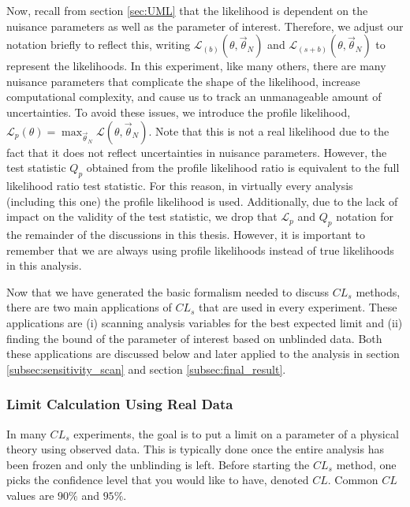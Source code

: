 Now, recall from section \ref{sec:UML} that the likelihood is dependent on the nuisance parameters as well as the parameter of interest. Therefore, we adjust our notation briefly to reflect this, writing $\mathcal{L}_{(b)}(\theta, \vec{\theta}_N)$ and $\mathcal{L}_{(s+b)}(\theta, \vec{\theta}_N)$ to represent the likelihoods. In this experiment, like many others, there are many nuisance parameters that complicate the shape of the likelihood, increase computational complexity, and cause us to track an unmanageable amount of uncertainties. To avoid these issues, we introduce the profile likelihood, $\mathcal{L}_p(\theta) = \max_{\vec{\theta}_N} \mathcal{L}(\theta, \vec{\theta}_N)$. Note that this is not a real likelihood due to the fact that it does not reflect uncertainties in nuisance parameters. However, the test statistic $Q_p$ obtained from the profile likelihood ratio is equivalent to the full likelihood ratio test statistic. For this reason, in virtually every analysis (including this one) the profile likelihood is used. Additionally, due to the lack of impact on the validity of the test statistic, we drop that $\mathcal{L}_p$ and $Q_p$ notation for the remainder of the discussions in this thesis. However, it is important to remember that we are always using profile likelihoods instead of true likelihoods in this analysis. 

Now that we have generated the basic formalism needed to discuss $CL_s$ methods, there are two main applications of $CL_s$ that are used in every experiment. These applications are (i) scanning analysis variables for the best expected limit and (ii) finding the bound of the parameter of interest based on unblinded data. Both these applications are discussed below and later applied to the analysis in section \ref{subsec:sensitivity_scan} and section \ref{subsec:final_result}.

\subsubsection{Limit Calculation Using Real Data}
\label{subsubsec:limit_calculation_theory}

In many $CL_s$ experiments, the goal is to put a limit on a parameter of a physical theory using observed data. This is typically done once the entire analysis has been frozen and only the unblinding is left. Before starting the $CL_s$ method, one picks the confidence level that you would like to have, denoted $CL$. Common $CL$ values are $90\%$ and $95\%$. 


